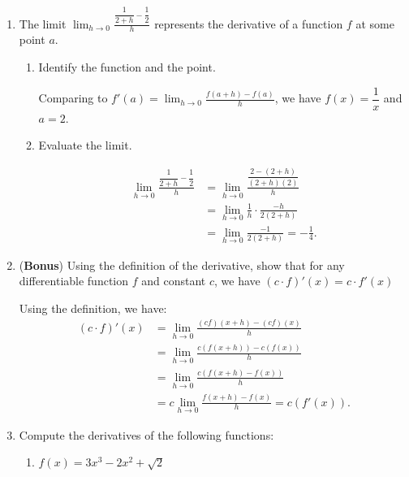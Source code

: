 \documentclass[12pt]{article}
\newcommand{\di}{\displaystyle}
\begin{document}
\thispagestyle{fancy}

 \begin{enumerate}
 \item  The limit $\di \lim_{h\to 0}\frac{\dfrac{1}{2+h}-\dfrac{1}{2}}{h}$ represents the derivative of a function $f$ at some point $a$.
\begin{enumerate}
 \item Identify the function and the point. 

\medskip

Comparing to $f'(a) = \di \lim_{h\to 0}\frac{f(a+h)-f(a)}{h}$, we have $f(x)=\dfrac{1}{x}$ and $a=2$.

\bigskip


 \item Evaluate the limit.

\medskip

\begin{align*}
 \lim_{h\to 0}\frac{\dfrac{1}{2+h}-\dfrac{1}{2}}{h} & = \lim_{h\to 0}\frac{\dfrac{2-(2+h)}{(2+h)(2)}}{h}\\
 & = \lim_{h\to 0}\frac{1}{h}\cdot\frac{-h}{2(2+h)}\\
 & = \lim_{h\to 0}\frac{-1}{2(2+h)} = -\frac{1}{4}.
\end{align*}

 \end{enumerate}

\bigskip

 \item (\textbf{Bonus}) Using the definition of the derivative, show that for any differentiable function $f$ and constant $c$, we have $(c\cdot f)'(x) = c\cdot f'(x)$

\bigskip

Using the definition, we have:
\begin{align*}
 (c\cdot f)'(x) & = \lim_{h\to 0}\frac{(cf)(x+h)-(cf)(x)}{h}\\
& = \lim_{h\to 0} \frac{c(f(x+h))-c(f(x))}{h}\\
& = \lim_{h\to 0} \frac{c(f(x+h)-f(x))}{h}\\
& = c\lim_{h\to 0}\frac{f(x+h)-f(x)}{h} = c(f'(x)).
\end{align*}


\newpage

 \item Compute the derivatives of the following functions:
\begin{enumerate}
 \item $f(x) = 3x^3-2x^2+\sqrt{2}$


\end{enumerate}
\end{enumerate}
\end{document}
